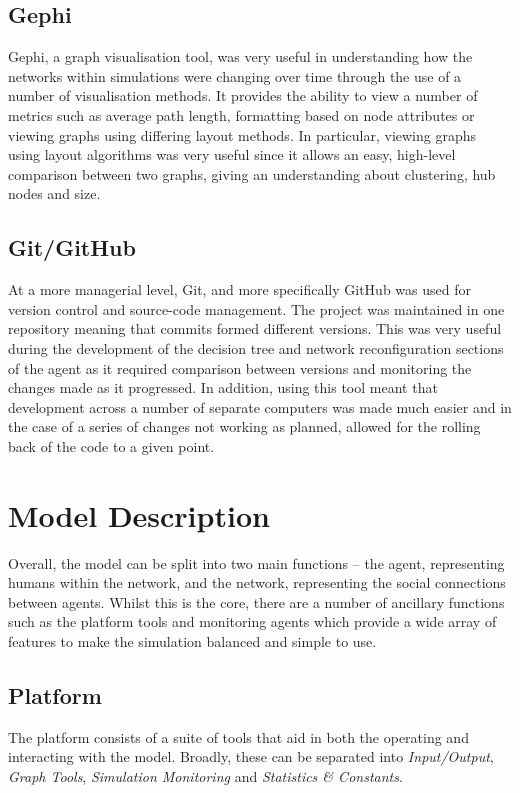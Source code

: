 \documentclass[]{report}
\begin{document}
\subsection{Gephi}
Gephi, a graph visualisation tool, was very useful in understanding how the networks within simulations were changing over time through the use of a number of visualisation methods. It provides the ability to view a number of metrics such as average path length, formatting based on node attributes or viewing graphs using differing layout methods. In particular, viewing graphs using layout algorithms was very useful since it allows an easy, high-level comparison between two graphs, giving an understanding about clustering, hub nodes and size.

\subsection{Git/GitHub}
At a more managerial level, Git, and more specifically GitHub was used for version control and source-code management. The project was maintained in one repository meaning that commits formed different versions. This was very useful during the development of the decision tree and network reconfiguration sections of the agent as it required comparison between versions and monitoring the changes made as it progressed. In addition, using this tool meant that development across a number of separate computers was made much easier and in the case of a series of changes not working as planned, allowed for the rolling back of the code to a given point.

\section{Model Description}
Overall, the model can be split into two main functions – the agent, representing humans within the network, and the network, representing the social connections between agents. Whilst this is the core, there are a number of ancillary functions such as the platform tools and monitoring agents which provide a wide array of features to make the simulation balanced and simple to use.

\subsection{Platform}
\label{sec:platform}
The platform consists of a suite of tools that aid in both the operating and interacting with the model. Broadly, these can be separated into \emph{Input/Output}, \emph{Graph Tools}, \emph{Simulation Monitoring} and \emph{Statistics \& Constants}.
\end{document}
